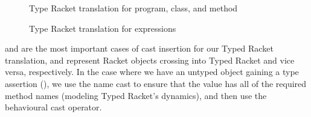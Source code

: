 \documentclass[a4paper,USenglish]{tex/lipics-v2016}
\begin{document}
\begin{figure}[h!]
\begin{mathpar}



\end{mathpar}
\caption{Type Racket translation for program, class, and method}
\label{fig:behtrans_cla}
\end{figure}


\begin{figure}[h!]
\begin{mathpar}



\end{mathpar}
\caption{Type Racket translation for expressions}
\label{fig:behtrans_exp}
\end{figure}

 and  are the most important cases of cast 
insertion for our Typed Racket translation, and represent Racket objects 
crossing into Typed Racket and vice versa, respectively. In the case where we 
have an untyped object gaining a type assertion (), we use the
name cast to ensure that the value has all of the required method names 
(modeling Typed Racket's dynamics), and then use the behavioural cast operator.
\end{document}
